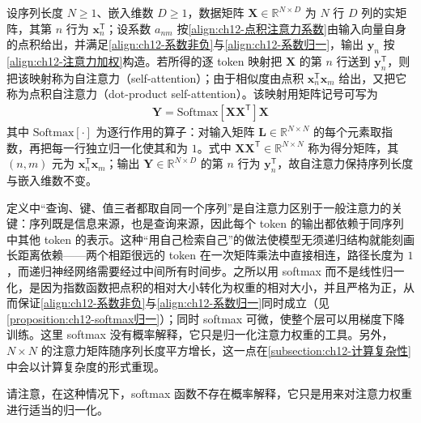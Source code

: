 \documentclass[../../main.tex]{subfiles}
\begin{document}
\begin{definition}[点积自注意力]\label{definition:ch12-点积自注意力}
设序列长度 $N\geqslant1$、嵌入维数 $D\geqslant1$，数据矩阵 $\mathbf{X}\in\mathbb{R}^{N\times D}$ 为 $N$ 行 $D$ 列的实矩阵，其第 $n$ 行为 $\mathbf{x}_n^{\mathsf{T}}$；设系数 $a_{nm}$ 按\eqref{align:ch12-点积注意力系数}由输入向量自身的点积给出，并满足\eqref{align:ch12-系数非负}与\eqref{align:ch12-系数归一}，输出 $\mathbf{y}_n$ 按\eqref{align:ch12-注意力加权}构造。若所得的逐 token 映射把 $\mathbf{X}$ 的第 $n$ 行送到 $\mathbf{y}_n^{\mathsf{T}}$，则把该映射称为自注意力（self-attention）；由于相似度由点积 $\mathbf{x}_n^{\mathsf{T}}\mathbf{x}_m$ 给出，又把它称为点积自注意力（dot-product self-attention）。该映射用矩阵记号可写为
\begin{align}
\mathbf{Y}=\mathrm{Softmax}\left[\mathbf{X}\mathbf{X}^{\mathsf{T}}\right]\mathbf{X}
\label{align:ch12-点积自注意力矩阵}
\end{align}
其中 $\mathrm{Softmax}[\cdot]$ 为逐行作用的算子：对输入矩阵 $\mathbf{L}\in\mathbb{R}^{N\times N}$ 的每个元素取指数，再把每一行独立归一化使其和为 $1$。式中 $\mathbf{X}\mathbf{X}^{\mathsf{T}}\in\mathbb{R}^{N\times N}$ 称为得分矩阵，其 $(n,m)$ 元为 $\mathbf{x}_n^{\mathsf{T}}\mathbf{x}_m$；输出 $\mathbf{Y}\in\mathbb{R}^{N\times D}$ 的第 $n$ 行为 $\mathbf{y}_n^{\mathsf{T}}$，故自注意力保持序列长度与嵌入维数不变。
\end{definition}

\begin{remark}
定义中“查询、键、值三者都取自同一个序列”是自注意力区别于一般注意力的关键：序列既是信息来源，也是查询来源，因此每个 token 的输出都依赖于同序列中其他 token 的表示。这种“用自己检索自己”的做法使模型无须递归结构就能刻画长距离依赖——两个相距很远的 token 在一次矩阵乘法中直接相连，路径长度为 $1$，而递归神经网络需要经过中间所有时间步。之所以用 softmax 而不是线性归一化，是因为指数函数把点积的相对大小转化为权重的相对大小，并且严格为正，从而保证\eqref{align:ch12-系数非负}与\eqref{align:ch12-系数归一}同时成立（见\cref{proposition:ch12-softmax归一}）；同时 softmax 可微，使整个层可以用梯度下降训练。这里 softmax 没有概率解释，它只是归一化注意力权重的工具。另外，$N\times N$ 的注意力矩阵随序列长度平方增长，这一点在\cref{subsection:ch12-计算复杂性}中会以计算复杂度的形式重现。
\end{remark}

请注意，在这种情况下，softmax 函数不存在概率解释，它只是用来对注意力权重进行适当的归一化。
\end{document}
